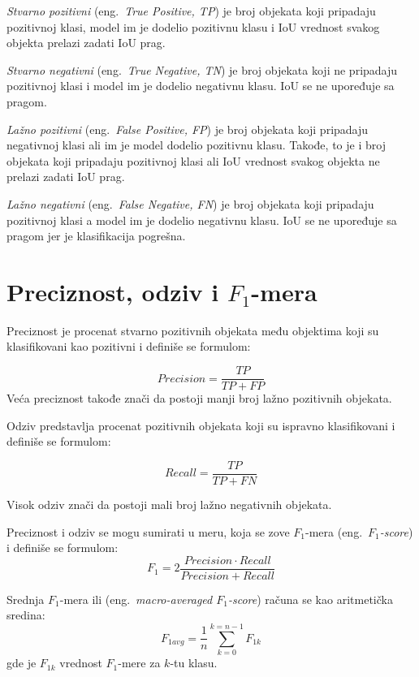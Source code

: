 \documentclass[12pt,oneside]{memoir}
\begin{document}
\textit{Stvarno pozitivni} (eng.~\textit{True Positive, TP}) je broj objekata koji pripadaju pozitivnoj klasi, model im je dodelio pozitivnu klasu i IoU vrednost svakog objekta prelazi zadati IoU prag.

\textit{Stvarno negativni} (eng.~\textit{True Negative, TN}) je broj objekata koji ne pripadaju pozitivnoj klasi i model im je dodelio negativnu klasu. IoU se ne upoređuje sa pragom.

\textit{Lažno pozitivni} (eng.~\textit{False Positive, FP}) je broj objekata koji pripadaju negativnoj klasi ali im je model dodelio pozitivnu klasu. Takođe, to je i broj objekata koji pripadaju pozitivnoj klasi ali IoU vrednost svakog objekta ne prelazi zadati IoU prag.

\textit{Lažno negativni} (eng.~\textit{False Negative, FN}) je broj objekata koji pripadaju pozitivnoj klasi a model im je dodelio negativnu klasu. IoU se ne upoređuje sa pragom jer je klasifikacija pogrešna. 

\section{Preciznost, odziv i \texorpdfstring{$F_1$}{TEXT}-mera}
Preciznost je procenat stvarno pozitivnih objekata među objektima koji su klasifikovani kao pozitivni i definiše se formulom:

\begin{equation}
    Precision = \frac{TP}{TP+FP}
\end{equation}
Veća preciznost takođe znači da postoji manji broj lažno pozitivnih objekata.

Odziv predstavlja procenat pozitivnih objekata koji su ispravno klasifikovani i definiše se formulom:

\begin{equation}
    Recall = \frac{TP}{TP+FN}
\end{equation}

Visok odziv znači da postoji mali broj lažno negativnih objekata.

Preciznost i odziv se mogu sumirati u meru, koja se zove $F_1$-mera (eng.~\textit{$F_1$-score}) i definiše se formulom:
\begin{equation}
\label{eq:f1}
    F_1 = 2\frac{Precision \cdot Recall}{Precision+Recall}
\end{equation}

Srednja $F_1$-mera ili (eng.~\textit{macro-averaged $F_1$-score}) računa se kao aritmetička sredina:
\begin{equation}
\label{eq:f1a}
    F_{1avg} = \frac{1}{n}\sum_{k=0}^{k=n-1} F_{1k}
\end{equation}
gde je \(F_{1k}\) vrednost $F_1$-mere za \(k\)-tu klasu.
\end{document}
